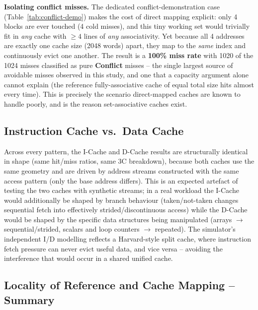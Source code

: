 \documentclass[11pt]{article}
\begin{document}
\textbf{Isolating conflict misses.} The dedicated
conflict-demonstration case (Table~\ref{tab:conflict-demo}) makes the
cost of direct mapping explicit: only 4 blocks are ever touched (4
cold misses), and this tiny working set would trivially fit in
\emph{any} cache with $\geq 4$ lines of \emph{any} associativity. Yet
because all 4 addresses are exactly one cache size (2048 words) apart,
they map to the \emph{same} index and continuously evict one another.
The result is a \textbf{100\% miss rate} with 1020 of the 1024 misses
classified as pure \textbf{Conflict} misses -- the single largest
source of avoidable misses observed in this study, and one that a
capacity argument alone cannot explain (the reference fully-associative
cache of equal total size hits almost every time). This is precisely
the scenario direct-mapped caches are known to handle poorly, and is
the reason set-associative caches exist.

\subsection{Instruction Cache vs.\ Data Cache}

Across every pattern, the I-Cache and D-Cache results are structurally
identical in shape (same hit/miss ratios, same 3C breakdown), because
both caches use the same geometry and are driven by address streams
constructed with the same access pattern (only the base address
differs). This is an expected artefact of testing the two caches with
synthetic streams; in a real workload the I-Cache would additionally
be shaped by branch behaviour (taken/not-taken changes sequential
fetch into effectively strided/discontinuous access) while the D-Cache
would be shaped by the specific data structures being manipulated
(arrays $\to$ sequential/strided, scalars and loop counters $\to$
repeated). The simulator's independent I/D modelling reflects a
Harvard-style split cache, where instruction fetch pressure can never
evict useful data, and vice versa -- avoiding the interference that
would occur in a shared unified cache.

\subsection{Locality of Reference and Cache Mapping -- Summary}
\end{document}
